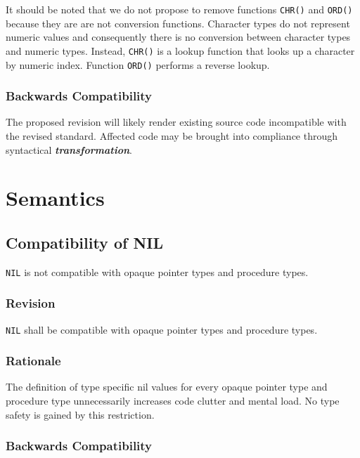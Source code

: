 \documentclass[10pt,a4paper,leqno,fleqn]{article}
\renewcommand{\emph}[1]{\textbf{\textit{#1}}}
\begin{document}
It should be noted that we do not propose to remove functions \verb|CHR()| and
\verb|ORD()| because they are are not conversion functions. Character types do
not represent numeric values and consequently there is no conversion between
character types and numeric types. Instead, \verb|CHR()| is a lookup function that
looks up a character by numeric index. Function \verb|ORD()| performs a reverse lookup.

\subsubsection{Backwards Compatibility}

The proposed revision will likely render existing source code incompatible with
the revised standard. Affected code may be brought into compliance
through syntactical \emph{transformation}.


\section{Semantics}

\subsection{Compatibility of NIL}

\verb|NIL| is not compatible with opaque pointer types and procedure types.

\subsubsection{Revision}

\verb|NIL| shall be compatible with opaque pointer types and procedure types.

\subsubsection{Rationale}

The definition of type specific nil values for every opaque pointer type and
procedure type unnecessarily increases code clutter and mental load.
No type safety is gained by this restriction.

\subsubsection{Backwards Compatibility}
\end{document}
